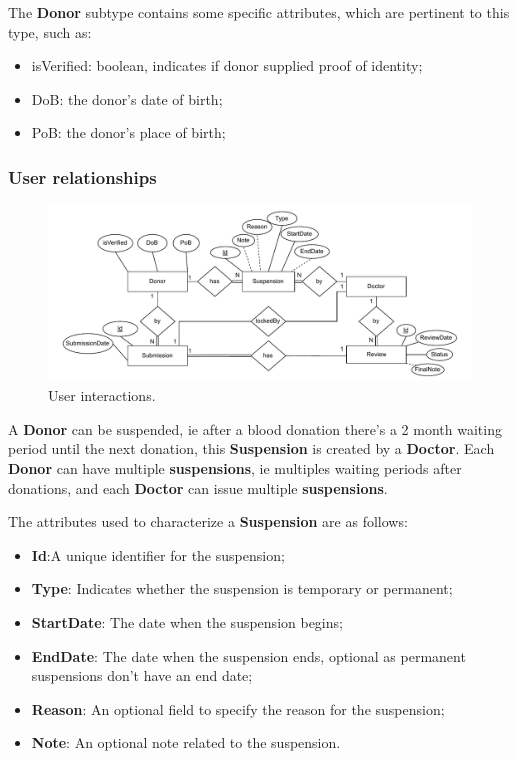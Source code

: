 The \textbf{Donor} subtype contains some specific attributes, which are pertinent to this type, such as:
\begin{itemize}
	\item isVerified: boolean, indicates if donor supplied proof of identity;
	\item DoB: the donor's date of birth;
	\item PoB: the donor's place of birth;
\end{itemize}

\subsubsection{User relationships}

\begin{figure}[H]
	\begin{center}
		\includegraphics[width=\textwidth,height=\textheight,keepaspectratio]{./figures/User_Interactions.pdf}
	\end{center}
	\caption{User interactions.}\label{fig:user_interactions}
\end{figure}

A \textbf{Donor} can be suspended, ie after a blood donation there's a 2 month waiting period until the next donation, this \textbf{Suspension} is created by a \textbf{Doctor}.
Each \textbf{Donor} can have multiple \textbf{suspensions}, ie multiples waiting periods after donations, and each \textbf{Doctor} can issue multiple \textbf{suspensions}.

The attributes used to characterize a \textbf{Suspension} are as follows:

\begin{itemize}
	\item \textbf{Id}:A unique identifier for the suspension;
	\item \textbf{Type}: Indicates whether the suspension is temporary or permanent;
	\item \textbf{StartDate}: The date when the suspension begins;
	\item \textbf{EndDate}: The date when the suspension ends, optional as permanent suspensions don't have an end date;
	\item \textbf{Reason}: An optional field to specify the reason for the suspension;
	\item \textbf{Note}: An optional note related to the suspension.
\end{itemize}

